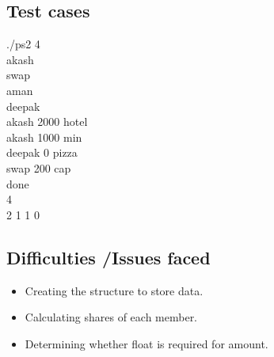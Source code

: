 \documentclass[12pt,a4paper]{article}
\begin{document}
        \subsection{Test cases}
            ./ps2 4\\
    		akash\\
            swap\\
            aman\\
            deepak\\
            akash 2000 hotel\\
            akash 1000 min\\
            deepak 0 pizza\\
            swap 200 cap\\
            done\\
            4\\
            2 1 1 0\\
        \subsection{Difficulties /Issues faced}
            \begin{itemize}
                \item Creating the structure to store data.
                \item Calculating shares of each member.
                \item Determining whether float is required for amount.
            \end{itemize}
\end{document}
